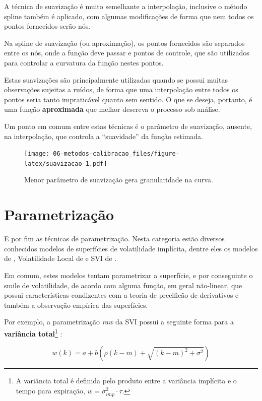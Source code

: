 \documentclass[]{book}
\let\rmarkdownfootnote\footnote%
\def\footnote{\protect\rmarkdownfootnote}
\theoremstyle{definition}
\theoremstyle{definition}
\theoremstyle{definition}
\theoremstyle{remark}
\begin{document}
A técnica de suavização é muito semelhante a interpolação, inclusive o método spline também é aplicado, com algumas modificações de forma que nem todos os pontos fornecidos serão nós.

Na spline de suavização (ou aproximação), os pontos fornecidos são separados entre os nós, onde a função deve passar e pontos de controle, que são utilizados para controlar a curvatura da função nestes pontos.

Estas suavizações são principalmente utilizadas quando se possui muitas observações sujeitas a ruídos, de forma que uma interpolação entre todos os pontos seria tanto impraticável quanto sem sentido. O que se deseja, portanto, é uma função \textbf{aproximada} que melhor descreva o processo sob análise.

Um ponto em comum entre estas técnicas é o parâmetro de suavização, ausente, na interpolação, que controla a ``suavidade'' da função estimada.

\begin{figure}
\centering
\texttt{[image: 06-metodos-calibracao\_files/figure-latex/suavizacao-1.pdf]}
\caption{\label{fig:suavizacao}Menor parâmetro de suavização gera granularidade na curva.}
\end{figure}

\hypertarget{parametrizacao}{%
\section{Parametrização}\label{parametrizacao}}

E por fim as técnicas de parametrização. Nesta categoria estão diversos conhecidos modelos de superfícies de volatilidade implícita, dentre eles os modelos de \citet{Heston1993}, Volatilidade Local de \citet{Dupire1994} e SVI de \citet{Gatheral2004}.

Em comum, estes modelos tentam parametrizar a superfície, e por conseguinte o smile de volatilidade, de acordo com alguma função, em geral não-linear, que possui características condizentes com a teoria de precificão de derivativos e também a observação empírica das superfícies.

Por exemplo, a parametrização \emph{raw} da SVI possui a seguinte forma para a \textbf{variância total}\footnote{A variância total é definida pelo produto entre a variância implícita e o tempo para expiração, \(w=\sigma^2_{imp}\cdot\tau\).} :

\[ w(k) = a + b\left(\rho(k-m)+\sqrt{(k-m)^2 + \sigma^2}\right)\]
\end{document}
